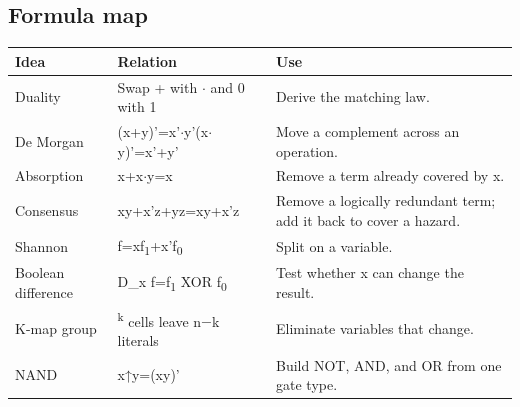 \documentclass[11pt]{article}
\begin{document}
\begin{keepsection}
\section{Formula map}

\begin{center}\small\begin{tabularx}{\linewidth}{>{\raggedright\arraybackslash}X>{\raggedright\arraybackslash}X>{\raggedright\arraybackslash}X}\toprule
\textbf{Idea} & \textbf{Relation} & \textbf{Use} \\ \midrule
Duality & Swap + with \ensuremath{\cdot} and 0 with 1 & Derive the matching law. \\
De Morgan & (x+y)'=x'\ensuremath{\cdot}y'(x\ensuremath{\cdot}y)'=x'+y' & Move a complement across an operation. \\
Absorption & x+x\ensuremath{\cdot}y=x & Remove a term already covered by x. \\
Consensus & xy+x'z+yz=xy+x'z & Remove a logically redundant term; add it back to cover a hazard. \\
Shannon & f=xf\textsubscript{1}+x'f\textsubscript{0} & Split on a variable. \\
Boolean difference & D\_x f=f\textsubscript{1} XOR f\textsubscript{0} & Test whether x can change the result. \\
K-map group & 2\textsuperscript{k} cells leave n\ensuremath{-}k literals & Eliminate variables that change. \\
NAND & x↑y=(xy)' & Build NOT, AND, and OR from one gate type. \\
\bottomrule\end{tabularx}\end{center}
\end{keepsection}
\end{document}
